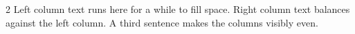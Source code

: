 \documentclass{article}
\begin{document}
\begin{multicols}{2}
Left column text runs here for a while to fill space.
Right column text balances against the left column.
A third sentence makes the columns visibly even.
\end{multicols}
\end{document}
